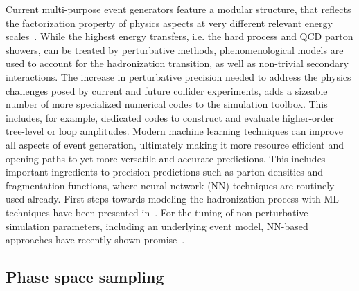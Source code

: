 \documentclass[submission,Phys]{SciPost}
\begin{document}
Current multi-purpose event generators feature a modular structure, that reflects the factorization property of physics aspects at very different relevant energy scales~\cite{Sjostrand:2014zea,Sherpa:2019gpd,Alwall:2014hca,Bellm:2015jjp,Kilian:2007gr}. While the highest energy transfers, i.e. the hard process and QCD parton showers, can be treated by perturbative methods, phenomenological models are used to account for the hadronization transition, as well as non-trivial secondary interactions. The increase in perturbative precision needed to address the physics challenges posed by current and future collider experiments, adds a sizeable number of more specialized numerical codes to the simulation toolbox. This includes, for example, dedicated codes to construct and evaluate higher-order tree-level or loop amplitudes. Modern machine learning techniques can improve all aspects of event generation, ultimately making it more resource efficient and opening paths to yet more versatile and accurate predictions. This includes important ingredients to precision predictions such as parton densities and fragmentation functions, where neural network (NN) techniques are routinely used already. First steps towards modeling the hadronization process with ML techniques have been presented in~\cite{Ilten:2022jfm}.
For the tuning of non-perturbative simulation parameters, including an underlying event model, NN-based approaches have recently shown promise~\cite{Lazzarin:2020uvv}.

\subsection{Phase space sampling}
\label{sec:generators_ps}
\end{document}
